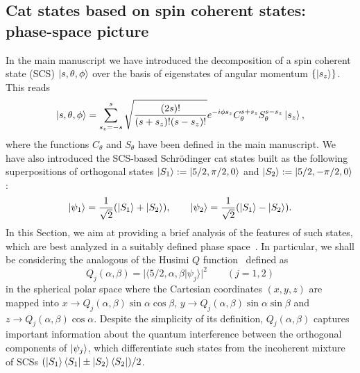 \subsection{Cat states based on spin coherent states: phase-space picture}

In the main manuscript we have introduced the decomposition of a spin coherent state (SCS) $\ket{s,\theta,\phi}$ over the basis of eigenstates of angular momentum $\{\ket{s_z}\}$. This reads
\begin{equation}
\ket{s,\theta,\phi}=\sum^s_{s_z=-s}\sqrt{\frac{(2s)!}{(s+s_z)!(s-s_z)!}}e^{-i\phi s_z}C^{s+s_z}_\theta S^{s-s_z}_\theta\ket{s_z},
\end{equation}
where the functions $C_{\theta}$ and $S_\theta$ have been defined in the main manuscript. We have also introduced the SCS-based Schr{\"o}dinger cat states built as the following superpositions of orthogonal states $\ket{S_1}:=\ket{5/2,\pi/2,0}$ and $\ket{S_2}:=\ket{5/2,-\pi/2,0}$:
\begin{equation}
\ket{\psi_{1}}=\frac{1}{\sqrt 2}(\ket{S_1}+\ket{S_2}),\qquad\ket{\psi_{2}}=\frac{1}{\sqrt 2}(\ket{S_1}-\ket{S_2}).
\end{equation}
In this Section, we aim at providing a brief analysis of the features of such states, which are best analyzed in a suitably defined phase space~\cite{agarwal1997atomic}. In particular, we shall be considering the analogous of the Husimi $Q$ function~\cite{WM} defined as
\begin{equation}
\label{deco}
Q_j(\alpha,\beta)=\vert\langle{5/2,\alpha,\beta}\vert\psi_j\rangle\vert^2\qquad(j=1,2)
\end{equation}
in the spherical polar space where the Cartesian coordinates $(x,y,z)$ are mapped into $x\to Q_j(\alpha,\beta)\sin\alpha\cos\beta$, $y\to Q_j(\alpha,\beta)\sin\alpha\sin\beta$ and $z\to Q_j(\alpha,\beta)\cos\alpha$. Despite the simplicity of its definition, $Q_j(\alpha,\beta)$ captures important information about the quantum interference between the orthogonal components of $\ket{\psi_{j}}$, which differentiate such states from the incoherent mixture of SCSs $(\ket{S_1}\bra{S_1}\pm\ket{S_2}\bra{S_2})/2$. 

